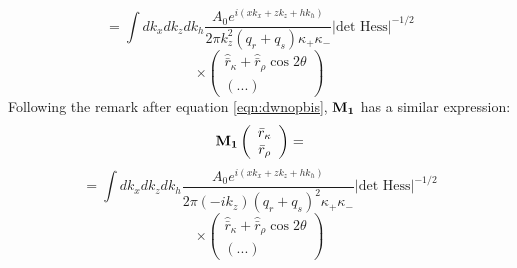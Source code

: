 \[
= \int dk_x dk_z dk_h \frac{A_0 e^{i(xk_{x}+zk_{z}+hk_{h})}}{2\pi 
  k^2_z(q_r + q_s)\kappa_+\kappa_-} |\mbox{det Hess}|^{-1/2} 
\]
\begin{equation}
\label{eqn:rk2}
\times 
\left(
\begin{array}{c}
\hat{\bar{r}}_{\kappa} + \hat{\bar{r}}_{\rho} \cos 2 \theta \\ 
(...) 
\end{array}
\right)
\end{equation}
Following the remark after equation \ref{eqn:dwnopbis}, $\bf M_1$ has
a similar expression:
\[
{\bf M_1} 
\left(\begin{array}{c}
\bar{r}_{\kappa} \\
\bar{r}_{\rho}
\end{array}
\right) = 
\]
\[
= \int dk_x dk_z dk_h \frac{A_0 e^{i(xk_{x}+zk_{z}+hk_{h})}}{2\pi 
  (-ik_z)(q_r + q_s)^2\kappa_+\kappa_-} |\mbox{det Hess}|^{-1/2} 
\]
\begin{equation}
\label{eqn:rk2bis}
\times 
\left(
\begin{array}{c}
\hat{\bar{r}}_{\kappa} + \hat{\bar{r}}_{\rho} \cos 2 \theta \\ 
(...) 
\end{array}
\right)
\end{equation}



